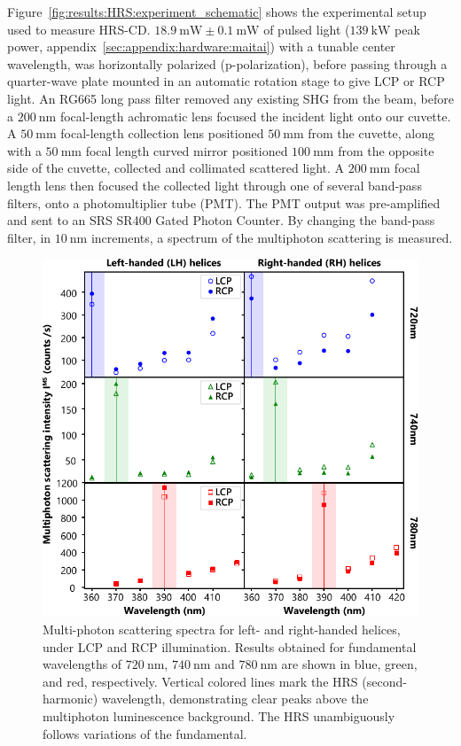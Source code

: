 Figure~\ref{fig:results:HRS:experiment_schematic} shows the experimental setup used to measure HRS-CD. 
$\SI{18.9}{\milli\watt}\pm\SI{0.1}{\milli\watt}$ of pulsed light ($\SI{139}{\kilo\watt}$ peak power, appendix~\ref{sec:appendix:hardware:maitai}) with a tunable center wavelength, was horizontally polarized (p-polarization), before passing through a quarter-wave plate mounted in an automatic rotation stage to give LCP or RCP light. An RG665 long pass filter removed any existing SHG from the beam, before a $\SI{200}{\nano\m}$ focal-length achromatic lens focused the incident light onto our cuvette. A $\SI{50}{\milli\m}$ focal-length collection lens positioned $\SI{50}{\milli\m}$ from the cuvette, along with a $\SI{50}{\milli\m}$ focal length curved mirror positioned $\SI{100}{\milli\m}$ from the opposite side of the cuvette, collected and collimated scattered light. A $\SI{200}{\milli\m}$ focal length lens then focused the collected light through one of several band-pass filters, onto a photomultiplier tube (PMT). The PMT output was pre-amplified and sent to an SRS SR400 Gated Photon Counter. 
By changing the band-pass filter, in $\SI{10}{\nano\m}$ increments, a spectrum of the multiphoton scattering is measured.

\begin{figure}[htb!]	
    \centering	
    \includegraphics[scale=1]{./figures/results/HRS/hrs_data.pdf}
    \caption{\label{fig:results:HRS:hrs_data}
    Multi-photon scattering spectra for left- and right-handed helices, under LCP and RCP illumination. Results obtained for fundamental wavelengths of $\SI{720}{\nano\m}$, $\SI{740}{\nano\m}$ and $\SI{780}{\nano\m}$ are shown in blue, green, and red, respectively. Vertical colored lines mark the HRS (second-harmonic) wavelength, demonstrating clear peaks above the multiphoton luminescence background. The HRS unambiguously follows variations of the fundamental. }	
\end{figure}

